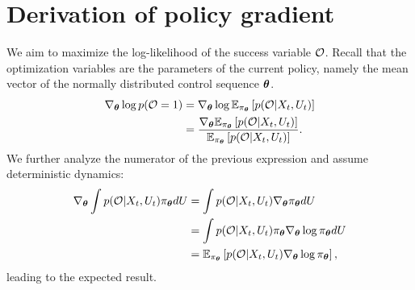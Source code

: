 \section{Derivation of policy gradient}\label{sec:app_derivation_policy_gradient}
We aim to maximize the log-likelihood of the success variable $\mathcal{O}$. Recall that the optimization variables are the parameters of the current policy, namely the mean vector of the normally distributed control sequence $\boldsymbol{\theta}$. 
\begin{align*}
    \nabla_{\boldsymbol{\theta}} \log p(\mathcal{O} = 1) &= \nabla_{\boldsymbol{\theta}} \log \mathbb{E}_{\pi_{\boldsymbol{\theta}}} \left [p(\mathcal{O} | X_t, U_t)\right] \\
    &= \frac{\nabla_{\boldsymbol{\theta}} \mathbb{E}_{\pi_{\boldsymbol{\theta}}} \left [p(\mathcal{O} | X_t, U_t)\right]}{\mathbb{E}_{\pi_{\boldsymbol{\theta}}} \left [p(\mathcal{O} | X_t, U_t)\right]}.
\end{align*}
We further analyze the numerator of the previous expression and assume deterministic dynamics:
\begin{align*}
    \nabla_{\boldsymbol{\theta}} \int p(\mathcal{O} | X_t, U_t) \pi_{\boldsymbol{\theta}} dU &= \int p(\mathcal{O} | X_t, U_t) \nabla_{\boldsymbol{\theta}} \pi_{\boldsymbol{\theta}} dU \\
    &= \int p(\mathcal{O} | X_t, U_t) \pi_{\boldsymbol{\theta}} \nabla_{\boldsymbol{\theta}} \log \pi_{\boldsymbol{\theta}} dU \\
    &= \mathbb{E}_{\pi_{\boldsymbol{\theta}}} \left [p(\mathcal{O} | X_t, U_t) \nabla_{\boldsymbol{\theta}} \log \pi_{\boldsymbol{\theta}}\right],
\end{align*}
leading to the expected result. 

